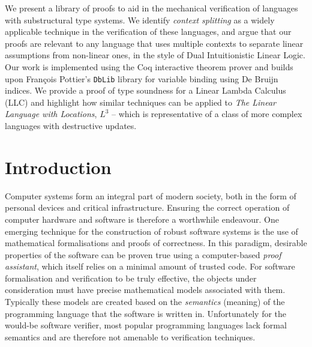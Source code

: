 \documentclass[]{unswthesis}
\newenvironment{abstract}
 {
  \begin{center}
  \bfseries \abstractname\vspace{-.5em}\vspace{0pt}
  \end{center}
  \list{}{
    \setlength{\leftmargin}{.5cm}%
    \setlength{\rightmargin}{\leftmargin}%
  }%
  \item\relax}
 {\endlist}
\newcommand{\Francois}{Fran\frenchc{c}ois }
\let\frenchc\c
\let\c\texttt
\let\i\textit
\begin{document}
\frontmatter
\maketitle


\begin{abstract}
We present a library of proofs to aid in the mechanical verification of languages with substructural type systems. We identify \i{context splitting} as a widely applicable technique in the verification of these languages, and argue that our proofs are relevant to any language that uses multiple contexts to separate linear assumptions from non-linear ones, in the style of Dual Intuitionistic Linear Logic. Our work is implemented using the Coq interactive theorem prover and builds upon \Francois Pottier's \c{DbLib} library for variable binding using De Bruijn indices. We provide a proof of type soundness for a Linear Lambda Calculus (LLC) and highlight how similar techniques can be applied to \i{The Linear Language with Locations}, $L^3$ -- which is representative of a class of more complex languages with destructive updates.
\end{abstract}

\tableofcontents

\mainmatter

\chapter{Introduction}
\label{ch:intro}

Computer systems form an integral part of modern society, both in the form of personal devices and critical infrastructure. Ensuring the correct operation of computer hardware and software is therefore a worthwhile endeavour. One emerging technique for the construction of robust software systems is the use of mathematical formalisations and proofs of correctness. In this paradigm, desirable properties of the software can be proven true using a computer-based \i{proof assistant}, which itself relies on a minimal amount of trusted code. For software formalisation and verification to be truly effective, the objects under consideration must have precise mathematical models associated with them. Typically these models are created based on the \i{semantics} (meaning) of the programming language that the software is written in. Unfortunately for the would-be software verifier, most popular programming languages lack formal semantics and are therefore not amenable to verification techniques.
\end{document}
